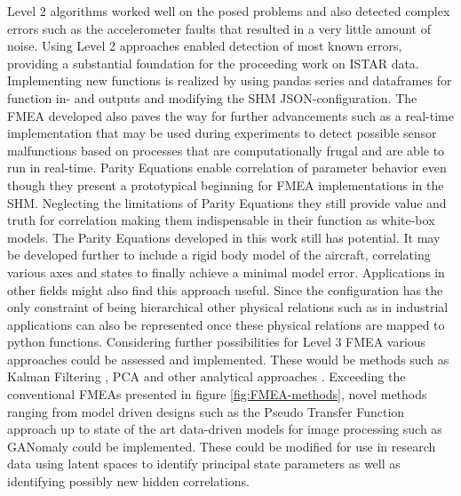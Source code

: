 Level 2 algorithms worked well on the posed problems and also detected complex errors such as the accelerometer faults that resulted in a very little amount of noise. Using Level 2 approaches enabled detection of most known errors, providing a substantial foundation for the proceeding work on ISTAR data. Implementing new functions is realized by using pandas series and dataframes for function in- and outputs and modifying the SHM JSON-configuration.
The FMEA developed also paves the way for further advancements such as a real-time implementation that may be used during experiments to detect possible sensor malfunctions based on processes that are computationally frugal and are able to run in real-time.
%
Parity Equations enable correlation of parameter behavior even though they present a prototypical beginning for FMEA implementations in the SHM. Neglecting the limitations of Parity Equations they still provide value and truth for correlation making them indispensable in their function as white-box models. The Parity Equations developed in this work still has potential. It may be developed further to include a rigid body model of the aircraft, correlating various axes and states to finally achieve a minimal model error.
Applications in other fields might also find this approach useful. Since the configuration has the only constraint of being hierarchical other physical relations such as in industrial applications can also be represented once these physical relations are mapped to python functions.
Considering further possibilities for Level 3 FMEA various approaches could be assessed and implemented. These would be methods such as Kalman Filtering \cite{lie_synthetic_2013}, PCA \cite{isermann_fault-diagnosis_2006} and other analytical approaches \cite{freeman_air_2013, perhinschi_integrated_2010}.  Exceeding the conventional FMEAs presented in figure \ref{fig:FMEA-methods}, novel methods ranging from model driven designs such as the Pseudo Transfer Function approach \cite{aljanaideh_aircraft_2015} up to state of the art data-driven models for image processing such as GANomaly \cite{akcay_ganomaly_2018} could be implemented. These could be modified for use in research data using latent spaces to identify principal state parameters as well as identifying possibly new hidden correlations.

